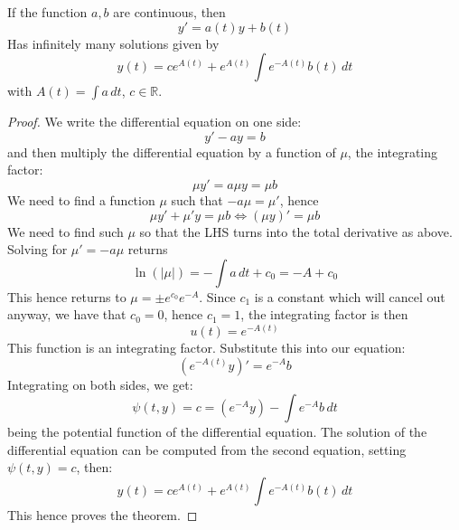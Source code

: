 \begin{theorem}
    If the function $a,b$ are continuous, then $$y'=a(t)y+b(t)$$ Has infinitely many solutions given by $$y(t)=ce^{A(t)}+e^{A(t)}\int e^{-A(t)}b(t) \, dt $$ with $A(t)=\int a \, dt$, $c\in\mathbb{R}$. 
\end{theorem}
\begin{proof}
    We write the differential equation on one side: 
$$y'-ay=b$$
and then multiply the differential equation by a function of $\mu$, the integrating factor: 
$$\mu y'=a\mu y=\mu b$$
We need to find a function $\mu$ such that $-a\mu=\mu'$, hence $$\mu y'+\mu'y=\mu b\iff(\mu y)'=\mu b$$
We need to find such $\mu$ so that the LHS turns into the total derivative as above. Solving for $\mu'=-a\mu$ returns $$\ln{(\lvert \mu \rvert )}=-\int a \, dt+c_{0}=-A+c_{0}$$
This hence returns to $\mu=\pm e^{c_{0}}e^{-A}$. Since $c_{1}$ is a constant which will cancel out anyway, we have that $c_{0}=0$, hence $c_{1}=1$, the integrating factor is then $$u(t)=e^{-A(t)}$$
This function is an integrating factor. Substitute this into our equation: 
$$(e^{-A(t)}y)'=e^{-A}b$$
Integrating on both sides, we get: 
$$\psi(t,y)=c=(e^{-A}y)-\int e^{-A}b \, dt $$ being the potential function of the differential equation. The solution of the differential equation can be computed from the second equation, setting $\psi(t,y)=c$, then:
$$y(t)=ce^{A(t)}+e^{A(t)}\int e^{-A(t)}b(t) \, dt $$
This hence proves the theorem. 
\end{proof}

